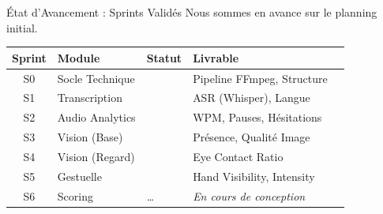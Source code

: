 \documentclass[10pt,aspectratio=169]{beamer}
\newcommand{\cmark}{\textcolor{success}{\ding{51}}}%
\begin{document}
\begin{frame}{État d'Avancement : Sprints Validés}
    Nous sommes en avance sur le planning initial.
    
    \vspace{0.3cm}
    \begin{imageframe}
        \small
        \begin{tabular}{cllll} %
            \toprule
            \textbf{Sprint} & \textbf{Module} & \textbf{Statut} & \textbf{Livrable} \\
            \midrule
            S0 & Socle Technique & \cmark & Pipeline FFmpeg, Structure \\
            S1 & Transcription & \cmark & ASR (Whisper), Langue \\
            \rowcolor{success!10}
            S2 & Audio Analytics & \cmark & WPM, Pauses, Hésitations \\
            \rowcolor{success!10}
            S3 & Vision (Base) & \cmark & Présence, Qualité Image \\
            \rowcolor{success!10}
            S4 & Vision (Regard) & \cmark & Eye Contact Ratio \\
            \rowcolor{success!10}
            S5 & Gestuelle & \cmark & Hand Visibility, Intensity \\
            S6 & Scoring & \dots & \textit{En cours de conception} \\
            \bottomrule
        \end{tabular}
    \end{imageframe}
\end{frame}
\end{document}
